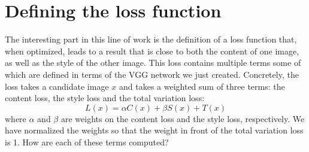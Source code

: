 \documentclass[]{book}
\newenvironment{Shaded}{\begin{snugshade}}{\end{snugshade}}
\newcommand{\KeywordTok}[1]{\textcolor[rgb]{0.13,0.29,0.53}{\textbf{#1}}}
\newcommand{\DecValTok}[1]{\textcolor[rgb]{0.00,0.00,0.81}{#1}}
\newcommand{\SpecialCharTok}[1]{\textcolor[rgb]{0.00,0.00,0.00}{#1}}
\newcommand{\StringTok}[1]{\textcolor[rgb]{0.31,0.60,0.02}{#1}}
\newcommand{\CommentTok}[1]{\textcolor[rgb]{0.56,0.35,0.01}{\textit{#1}}}
\newcommand{\ControlFlowTok}[1]{\textcolor[rgb]{0.13,0.29,0.53}{\textbf{#1}}}
\newcommand{\OperatorTok}[1]{\textcolor[rgb]{0.81,0.36,0.00}{\textbf{#1}}}
\newcommand{\BuiltInTok}[1]{#1}
\newcommand{\NormalTok}[1]{#1}
\theoremstyle{definition}
\theoremstyle{definition}
\theoremstyle{definition}
\theoremstyle{remark}
\begin{document}
\begin{Shaded}
\end{Shaded}

\section{Defining the loss function}\label{defining-the-loss-function}

The interesting part in this line of work is the definition of a loss
function that, when optimized, leads to a result that is close to both
the content of one image, as well as the style of the other image. This
loss contains multiple terms some of which are defined in terms of the
VGG network we just created. Concretely, the loss takes a candidate
image \(x\) and takes a weighted sum of three terms: the content loss,
the style loss and the total variation loss: \[
L(x) = \alpha C(x) + \beta S(x) + T(x)
\] where \(\alpha\) and \(\beta\) are weights on the content loss and
the style loss, respectively. We have normalized the weights so that the
weight in front of the total variation loss is 1. How are each of these
terms computed?
\end{document}
